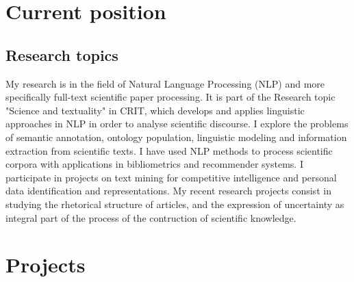 \documentclass[11pt,a4paper,roman]{moderncv}
\newcommand{\update}[1]{\fancyfoot[L]{\small \color{color2}{CV - Iana Atanassova - Last update: #1}}}
\begin{document}
\makecvtitle

\update{May 2021}

\sloppy

\section{Current position}



\subsection{Research topics}

My research is in the field of Natural Language Processing (NLP) and more specifically full-text scientific paper processing. 
It is part of the Research topic "Science and textuality" in CRIT, which develops and applies linguistic approaches in NLP in order to analyse scientific discourse.
I explore the problems of semantic annotation, ontology population, linguistic modeling and information extraction from scientific texts. I have used NLP methods to process scientific corpora with applications in bibliometrics and recommender systems. I %
participate in projects on text mining for competitive intelligence and personal data identification and representations.
My recent research projects consist in studying the rhetorical structure of articles, and the expression of uncertainty as integral part of the process of the contruction of scientific knowledge.






\section{Projects}
\end{document}
